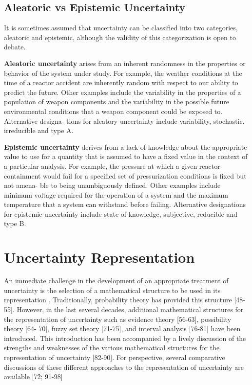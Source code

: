 \subsection{Aleatoric vs Epistemic Uncertainty}

It is sometimes assumed that uncertainty can be classified into two categories, aleatoric and epistemic, \cite{Kiureghian2009} although the validity of this categorization is open to debate. 

\textbf{Aleatoric uncertainty} arises from an inherent randomness in the properties or behavior of the system under study. For example, the weather conditions at the time of a reactor accident are inherently random with respect to our ability to predict the future. Other examples include the variability in the properties of a population of weapon components and the variability in the possible future environmental conditions that a weapon component could be exposed to. Alternative designa- tions for aleatory uncertainty include variability, stochastic, irreducible and type A. \cite{Helton2009}

\textbf{Epistemic uncertainty} derives from a lack of knowledge about the appropriate value to use for a quantity that is assumed to have a fixed value in the context of a particular analysis. For example, the pressure at which a given reactor containment would fail for a specified set of pressurization conditions is fixed but not amena- ble to being unambiguously defined. Other examples include minimum voltage required for the operation of a system and the maximum temperature that a system can withstand before failing. Alternative designations for epistemic uncertainty include state of knowledge, subjective, reducible and type B. \cite{Helton2009}

\section{Uncertainty Representation}

An immediate challenge in the development of an appropriate treatment of uncertainty is the selection of a mathematical structure to be used in its representation \cite{Helton2010}. Traditionally, probability theory has provided this structure [48-55]. However, in the last several decades, additional mathematical structures for the representation of uncertainty such as evidence theory [56-63], possibility theory [64- 70], fuzzy set theory [71-75], and interval analysis [76-81] have been introduced.
This introduction has been accompanied by a lively discussion of the strengths and weaknesses of the various mathematical structures for the representation of uncertainty [82-90]. For perspective, several comparative discussions of these different approaches to the representation of uncertainty are available [72; 91-98]

